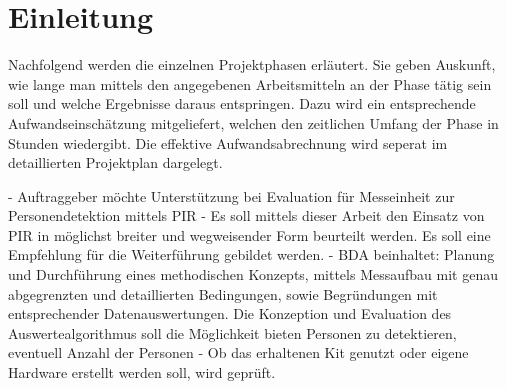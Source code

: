 \chapter{Einleitung}

\blindtext

Nachfolgend werden die einzelnen Projektphasen erläutert. Sie geben Auskunft, wie lange man mittels den angegebenen Arbeitsmitteln an der Phase tätig sein soll und welche Ergebnisse daraus entspringen. Dazu wird ein entsprechende Aufwandseinschätzung mitgeliefert, welchen den zeitlichen Umfang der Phase in Stunden wiedergibt. Die effektive Aufwandsabrechnung wird seperat im detaillierten Projektplan dargelegt. 

-	Auftraggeber möchte Unterstützung bei Evaluation für Messeinheit zur Personendetektion mittels PIR
-	Es soll mittels dieser Arbeit den Einsatz von PIR in möglichst breiter und wegweisender Form beurteilt werden. Es soll eine Empfehlung für die Weiterführung gebildet werden.
-	BDA beinhaltet: Planung und Durchführung eines methodischen Konzepts, mittels Messaufbau mit genau abgegrenzten und detaillierten Bedingungen, sowie   Begründungen mit entsprechender Datenauswertungen. Die Konzeption und Evaluation des Auswertealgorithmus soll die Möglichkeit bieten Personen zu detektieren, eventuell Anzahl der Personen
-	Ob das erhaltenen Kit genutzt oder eigene Hardware erstellt werden soll, wird geprüft.


